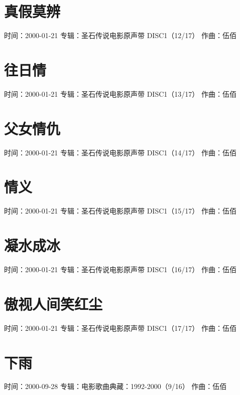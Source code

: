 \documentclass[UTF8,a4paper,oneside,twocolumn,12pt]{ctexbook}
\newcommand{\infopair}[2]{\textbullet #1：#2}
\newcommand{\zq}[1][伍佰]{\infopair{作曲}{#1}}
\newcommand{\zj}[1]{\infopair{专辑}{#1}}
\newcommand{\sj}[1]{\infopair{时间}{#1}}
\newenvironment{info}{\begin{flushleft}\kaishu
	}
	{\end{flushleft}\normalsize\yahei\par}
\begin{document}
\section{真假莫辨}
\begin{info}
	\sj{2000-01-21}
	\zj{圣石传说电影原声带 DISC1（12/17）}
	\zq
\end{info}

\section{往日情}
\begin{info}
	\sj{2000-01-21}
	\zj{圣石传说电影原声带 DISC1（13/17）}
	\zq
\end{info}

\section{父女情仇}
\begin{info}
	\sj{2000-01-21}
	\zj{圣石传说电影原声带 DISC1（14/17）}
	\zq
\end{info}

\section{情义}
\begin{info}
	\sj{2000-01-21}
	\zj{圣石传说电影原声带 DISC1（15/17）}
	\zq
\end{info}

\section{凝水成冰}
\begin{info}
	\sj{2000-01-21}
	\zj{圣石传说电影原声带 DISC1（16/17）}
	\zq
\end{info}

\section{傲视人间笑红尘}
\begin{info}
	\sj{2000-01-21}
	\zj{圣石传说电影原声带 DISC1（17/17）}
	\zq
\end{info}

\section{下雨}
\begin{info}
	\sj{2000-09-28}
	\zj{电影歌曲典藏：1992-2000（9/16）}
	\zq
\end{info}
\end{document}
